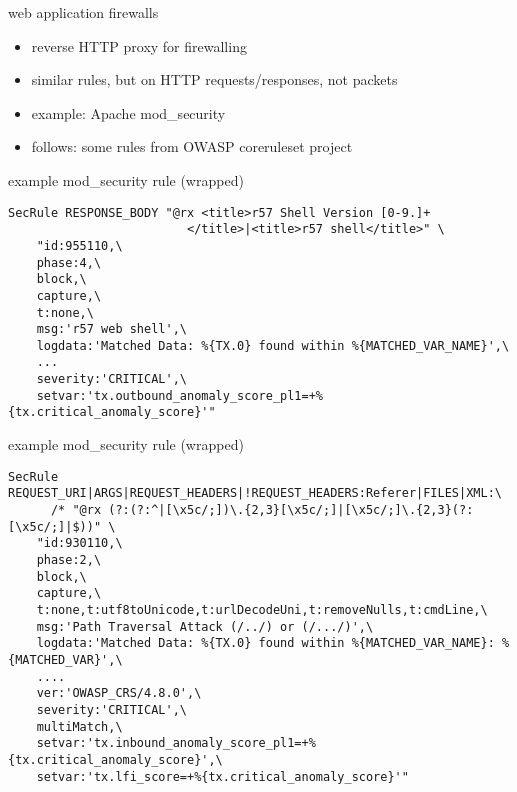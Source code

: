\begin{frame}{web application firewalls}
    \begin{itemize}
    \item reverse HTTP proxy for firewalling
    \item similar rules, but on HTTP requests/responses, not packets
    \vspace{.5cm}
    \item example: Apache mod\_security
    \item follows: some rules from OWASP coreruleset project
    \end{itemize}
\end{frame}

\begin{frame}[fragile]{example mod\_security rule (wrapped)}
\begin{Verbatim}[fontsize=\fontsize{9}{10}\selectfont]
SecRule RESPONSE_BODY "@rx <title>r57 Shell Version [0-9.]+
                         </title>|<title>r57 shell</title>" \
    "id:955110,\
    phase:4,\
    block,\
    capture,\
    t:none,\
    msg:'r57 web shell',\
    logdata:'Matched Data: %{TX.0} found within %{MATCHED_VAR_NAME}',\
    ...
    severity:'CRITICAL',\
    setvar:'tx.outbound_anomaly_score_pl1=+%{tx.critical_anomaly_score}'"
\end{Verbatim}
\end{frame}
\begin{frame}[fragile]{example mod\_security rule (wrapped)}
\begin{Verbatim}[fontsize=\fontsize{9}{10}\selectfont]
SecRule REQUEST_URI|ARGS|REQUEST_HEADERS|!REQUEST_HEADERS:Referer|FILES|XML:\
      /* "@rx (?:(?:^|[\x5c/;])\.{2,3}[\x5c/;]|[\x5c/;]\.{2,3}(?:[\x5c/;]|$))" \
    "id:930110,\
    phase:2,\
    block,\
    capture,\
    t:none,t:utf8toUnicode,t:urlDecodeUni,t:removeNulls,t:cmdLine,\
    msg:'Path Traversal Attack (/../) or (/.../)',\
    logdata:'Matched Data: %{TX.0} found within %{MATCHED_VAR_NAME}: %{MATCHED_VAR}',\
    ....
    ver:'OWASP_CRS/4.8.0',\
    severity:'CRITICAL',\
    multiMatch,\
    setvar:'tx.inbound_anomaly_score_pl1=+%{tx.critical_anomaly_score}',\
    setvar:'tx.lfi_score=+%{tx.critical_anomaly_score}'"
\end{Verbatim}
\end{frame}

